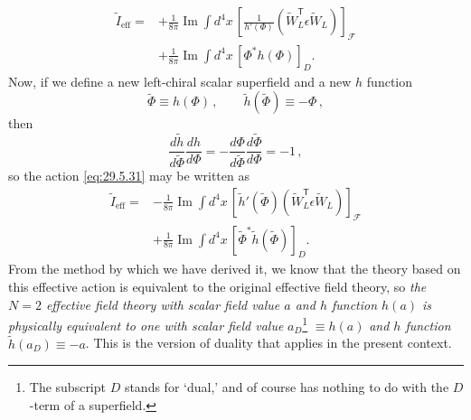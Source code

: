 \begin{equation}
  \begin{aligned}
  \widetilde I_{\mathrm{eff}}
  ={}&+\frac{1}{8\pi}\operatorname{Im}\int d^4x\,
    \left[
      \frac{1}{h'(\Phi)}
      \left(\widetilde W_L^{\mathsf T}\epsilon\widetilde W_L\right)
    \right]_{\mathcal F}
  \\
  &+\frac{1}{8\pi}\operatorname{Im}\int d^4x\,
    \left[\Phi^*h(\Phi)\right]_D.
  \end{aligned}
  \tag{29.5.31}\label{eq:29.5.31}
\end{equation}
Now, if we define a new left-chiral scalar superfield and a new \(h\)
function
\begin{equation}
  \widetilde\Phi\equiv h(\Phi)\,,
  \qquad
  \widetilde h(\widetilde\Phi)\equiv-\Phi\,,
  \tag{29.5.32}\label{eq:29.5.32}
\end{equation}
then
\begin{equation}
  \frac{d\widetilde h}{d\widetilde\Phi}\frac{dh}{d\Phi}
  =-\frac{d\Phi}{d\widetilde\Phi}
    \frac{d\widetilde\Phi}{d\Phi}
  =-1\,,
  \tag{29.5.33}\label{eq:29.5.33}
\end{equation}
so the action \eqref{eq:29.5.31} may be written as
\begin{equation}
  \begin{aligned}
  \widetilde I_{\mathrm{eff}}
  ={}&-\frac{1}{8\pi}\operatorname{Im}\int d^4x\,
    \left[
      \widetilde h'(\widetilde\Phi)
      \left(\widetilde W_L^{\mathsf T}\epsilon\widetilde W_L\right)
    \right]_{\mathcal F}
  \\
  &+\frac{1}{8\pi}\operatorname{Im}\int d^4x\,
    \left[\widetilde\Phi^*\widetilde h(\widetilde\Phi)\right]_D.
  \end{aligned}
  \tag{29.5.34}\label{eq:29.5.34}
\end{equation}
From the method by which we have derived it, we know that the theory based on
this effective action is equivalent to the original effective field theory,
so \textit{the \(N=2\) effective field theory with scalar field value \(a\)
and \(h\) function \(h(a)\) is physically equivalent to one with scalar
field value} \(a_D\)\footnote{The subscript \(D\) stands for `dual,' and of
course has nothing to do with the \(D\)-term of a superfield.}
\(\equiv h(a)\) \textit{and \(h\) function}
\(\widetilde h(a_D)\equiv-a\). This is the version of duality that applies
in the present context.

